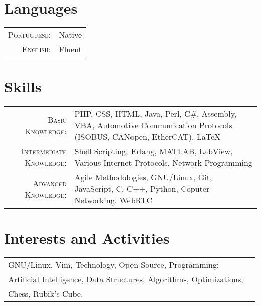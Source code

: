 \documentclass[a4paper,10pt]{article}
\begin{document}
\section*{Languages}
\begin{tabular}{@{} r p{10cm} @{}}
    \textsc{Portuguese:} & Native \\
    \textsc{English:}    & Fluent
\end{tabular}

\section*{Skills}
\begin{tabular}{@{} r p{10cm} @{}}
    \textsc{Basic Knowledge:} &
    PHP,
    CSS,
    HTML,
    Java,
    Perl,
    C\#,
    Assembly,
    VBA,
    Automotive Communication Protocols (ISOBUS, CANopen, EtherCAT),
    \LaTeX \\

    \textsc{Intermediate Knowledge:} &
    Shell Scripting,
    Erlang,
    MATLAB,
    LabView,
    Various Internet Protocols,
    Network Programming \\

    \textsc{Advanced Knowledge:} &
    Agile Methodologies,
    GNU/Linux,
    Git,
    JavaScript,
    C,
    C++,
    Python,
    Coputer Networking,
    WebRTC \\

\end{tabular}

\section*{Interests and Activities}
\begin{tabular}{@{} ll @{}}
    GNU/Linux, Vim, Technology, Open-Source, Programming; \\
    Artificial Intelligence, Data Structures, Algorithms, Optimizations; \\
    Chess, Rubik's Cube.
\end{tabular}
\end{document}

